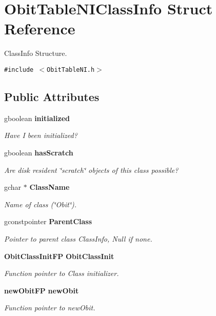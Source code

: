 \section{Obit\-Table\-NIClass\-Info Struct Reference}
\label{structObitTableNIClassInfo}
Class\-Info Structure.  


{\tt \#include $<$Obit\-Table\-NI.h$>$}

\subsection*{Public Attributes}
\begin{CompactItemize}
\item 
gboolean {\bf initialized}
\begin{CompactList}\small\item\em Have I been initialized? \item\end{CompactList}\item 
gboolean {\bf has\-Scratch}
\begin{CompactList}\small\item\em Are disk resident \char`\"{}scratch\char`\"{} objects of this class possible? \item\end{CompactList}\item 
gchar $\ast$ {\bf Class\-Name}
\begin{CompactList}\small\item\em Name of class (\char`\"{}Obit\char`\"{}). \item\end{CompactList}\item 
gconstpointer {\bf Parent\-Class}
\begin{CompactList}\small\item\em Pointer to parent class Class\-Info, Null if none. \item\end{CompactList}\item 
{\bf Obit\-Class\-Init\-FP} {\bf Obit\-Class\-Init}
\begin{CompactList}\small\item\em Function pointer to Class initializer. \item\end{CompactList}\item 
{\bf new\-Obit\-FP} {\bf new\-Obit}
\begin{CompactList}\small\item\em Function pointer to new\-Obit. \item\end{CompactList}\item 

\end{CompactItemize}
